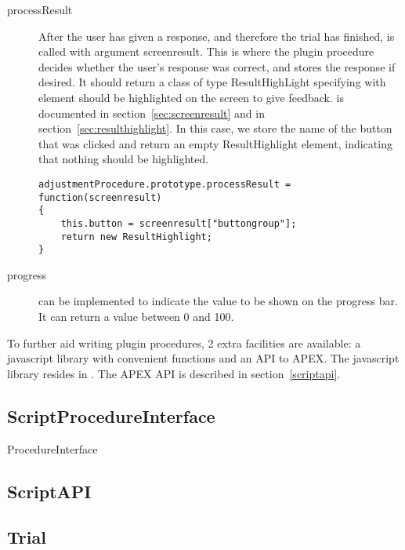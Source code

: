\begin{description}
\item[processResult] After the user has given a response, and therefore the trial has finished,  is called with argument screenresult. This is where the plugin procedure decides whether the user's response was correct, and stores the response if desired. It should return a class of type ResultHighLight specifying with element should be highlighted on the screen to give feedback.  is documented in section~\ref{sec:screenresult} and   in section~\ref{sec:resulthighlight}. In this case, we store the name of the button that was clicked and return an empty ResultHighlight element, indicating that nothing should be highlighted.
\begin{lstlisting}
adjustmentProcedure.prototype.processResult = function(screenresult)
{
    this.button = screenresult["buttongroup"];
    return new ResultHighlight;
}
\end{lstlisting}

\item[progress] can be implemented to indicate the value to be shown on the progress bar. It can return a value between 0 and 100.
\end{description}



To further aid writing plugin procedures, 2 extra facilities are available: a javascript library with convenient functions and an API to APEX. The javascript library resides in . The APEX API is described in section~\ref{scriptapi}.




\subsection{ScriptProcedureInterface}
\label{sec:scriptprocedureinterface}

ProcedureInterface


\subsection{ScriptAPI}
\label{sec:scriptapi}



\subsection{Trial}
\label{sec:trial}

